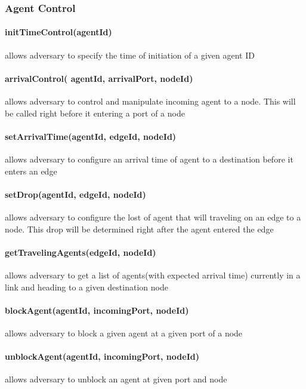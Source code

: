 \subsubsection*{Agent Control}

\paragraph{initTimeControl(agentId)} allows adversary to specify the time of initiation of a given agent ID

\paragraph{arrivalControl( agentId, arrivalPort, nodeId)} allows adversary to control and manipulate incoming agent to a node. This will be called right before it entering a port of a node

\paragraph{setArrivalTime(agentId, edgeId, nodeId)} allows adversary to configure an arrival time of agent to a destination before it enters an edge

\paragraph{setDrop(agentId, edgeId, nodeId)} allows adversary to configure the lost of agent that will traveling on an edge to a node. This drop will be determined right after the agent entered the edge

\paragraph{getTravelingAgents(edgeId, nodeId)} allows adversary to get a list of agents(with expected arrival time) currently in a link and heading to a given destination node

\paragraph{blockAgent(agentId, incomingPort, nodeId)} allows adversary to block a given agent at a given port of a node

\paragraph{unblockAgent(agentId, incomingPort, nodeId)} allows adversary to unblock an agent at given port and node

